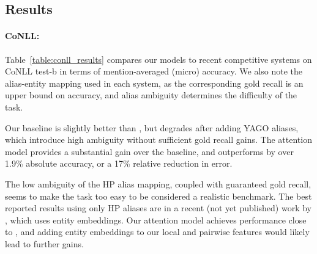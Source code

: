 \subsection{Results}

\paragraph*{CoNLL:}
Table~\ref{table:conll_results} compares our models to recent
competitive systems on CoNLL test-b in terms of mention-averaged (micro)
accuracy.  We also note the alias-entity mapping used in each
system, as the corresponding gold recall is an upper bound on
accuracy, and alias ambiguity determines the difficulty of the task.

Our baseline is slightly better than , but degrades
after adding YAGO aliases, which introduce high ambiguity without sufficient
gold recall gains. The attention model provides a substantial gain over
the baseline, and outperforms  by over
1.9\% absolute accuracy, or a 17\% relative reduction in error.

The low ambiguity of the HP alias mapping, coupled with
guaranteed gold recall, seems to make the task too easy to be
considered a realistic benchmark. 
The best reported results using only HP aliases 
are in a recent (not yet published) work by ,
which uses entity embeddings. Our attention model achieves
performance close to , and adding entity embeddings
to our local and pairwise features would likely lead to further gains.


